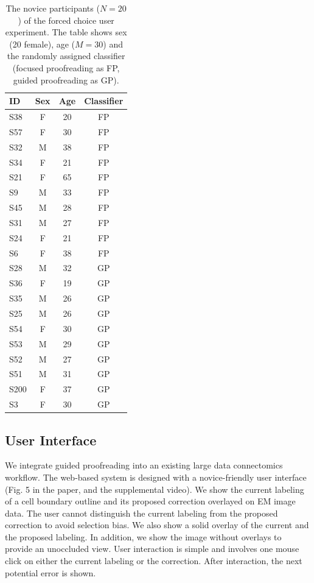 \begin{table}[t]
\caption{The novice participants ($N=20$) of the forced choice user experiment. The table shows sex (20 female), age ($M=30$) and the randomly assigned classifier (focused proofreading as FP, guided proofreading as GP).}%

\small{
\begin{tabular}{@{}l|c|c|c@{}}
	\toprule
     \textbf{ID} & \textbf{Sex} &  \textbf{Age} & \textbf{Classifier}  \\ \midrule	
S38 &		F & 20 & FP \\
S57&		F & 30 & FP \\ 
S32&		M & 38 & FP \\
S34&		F & 21 & FP \\
S21&		F & 65 & FP \\
S9 &	M & 33 & FP \\
S45 &		M & 28 & FP \\
S31&		M & 27 & FP \\
S24&		F & 21 & FP \\
S6	&	F & 38 & FP \\
S28	&	M&	32& GP \\
S36	&	F&	19& GP \\
S35	&	M&	26& GP \\
S25	&	M&	26& GP \\
S54	&	F&	30& GP \\
S53	&	M&	29& GP \\
S52	&	M	&27& GP \\
S51&		M&	31& GP \\
S200	 &	F	&37& GP \\
S3	 &F&	30 & GP



\end{tabular}
\hspace{2mm}
}
\label{tab:participants}
\end{table}

\subsection{User Interface}

We integrate guided proofreading into an existing large data connectomics workflow. The web-based system is designed with a novice-friendly user interface (Fig. 5 in the paper, and the supplemental video). We show the current labeling of a cell boundary outline and its proposed correction overlayed on EM image data. The user cannot distinguish the current labeling from the proposed correction to avoid selection bias. We also show a solid overlay of the current and the proposed labeling. In addition, we show the image without overlays to provide an unoccluded view. User interaction is simple and involves one mouse click on either the current labeling or the correction. After interaction, the next potential error is shown.

